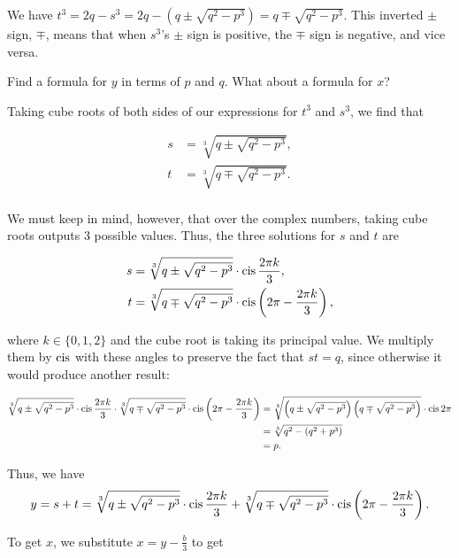 \documentclass[../key.tex]{subfiles}
\begin{document}
We have $t^3 = 2q - s^3 = 2q - (q \pm \sqrt{q^2 - p^3}) = q \mp \sqrt{q^2-p^3}$. This inverted $\pm$ sign, $\mp$, means that when $s^3$'s $\pm$ sign is positive, the $\mp$ sign is negative, and vice versa.

\begin{inner_problem}
\item Find a formula for $y$ in terms of $p$ and $q$. What about a formula for $x$?
\end{inner_problem}

Taking cube roots of both sides of our expressions for $t^3$ and $s^3$, we find that

\begin{align*}
s&=\sqrt[3]{q \pm \sqrt{q^2 - p^3}}, \\
t&=\sqrt[3]{q \mp \sqrt{q^2 - p^3}}. \\
\end{align*}

We must keep in mind, however, that over the complex numbers, taking cube roots outputs $3$ possible values. Thus, the three solutions for $s$ and $t$ are

\begin{align*}
s&=\sqrt[3]{q \pm \sqrt{q^2 - p^3}}\cdot \operatorname{cis} \frac{2\pi k}{3}, \\
t&=\sqrt[3]{q \mp \sqrt{q^2 - p^3}}\cdot \operatorname{cis} \left(2\pi - \frac{2\pi k}{3}\right), \\
\end{align*}

where $k\in \{0,1,2\}$ and the cube root is taking its principal value. We multiply them by $\operatorname{cis}$ with these angles to preserve the fact that $st = q$, since otherwise it would produce another result:

\begin{align*}
\sqrt[3]{q \pm \sqrt{q^2 - p^3}}\cdot \operatorname{cis} \frac{2\pi k}{3} \cdot \sqrt[3]{q \mp \sqrt{q^2 - p^3}}\cdot \operatorname{cis} \left(2\pi - \frac{2\pi k}{3}\right) &= \sqrt[3]{\left(q \pm \sqrt{q^2 - p^3}\right)\left(q \mp \sqrt{q^2 - p^3}\right)}\cdot \operatorname{cis} 2\pi \\
&= \sqrt[3]{q^2 - (q^2 + p^3)} \\
&= p.
\end{align*}

Thus, we have $$y=s+t=\sqrt[3]{q \pm \sqrt{q^2 - p^3}} \cdot \operatorname{cis} \frac{2\pi k}{3} + \sqrt[3]{q \mp \sqrt{q^2 - p^3}} \cdot \operatorname{cis} \left(2\pi - \frac{2\pi k}{3}\right).$$

To get $x$, we substitute $x=y-\frac{b}{3}$ to get
\end{document}
